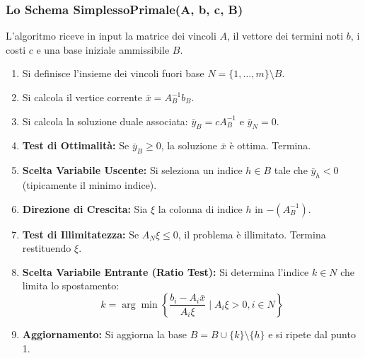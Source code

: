 \documentclass[12pt]{extarticle} %
\begin{document}
\subsubsection{Lo Schema SimplessoPrimale(A, b, c, B)}
L'algoritmo riceve in input la matrice dei vincoli $A$, il vettore dei termini noti $b$, i costi $c$ e una base iniziale ammissibile $B$.
\begin{enumerate}
    \item Si definisce l'insieme dei vincoli fuori base $N = \{1, \dots, m\} \setminus B$.
    \item Si calcola il vertice corrente $\bar{x} = A_B^{-1} b_B$.
    \item Si calcola la soluzione duale associata: $\bar{y}_B = c A_B^{-1}$ e $\bar{y}_N = 0$.
    \item \textbf{Test di Ottimalità:} Se $\bar{y}_B \ge 0$, la soluzione $\bar{x}$ è ottima. Termina.
    \item \textbf{Scelta Variabile Uscente:} Si seleziona un indice $h \in B$ tale che $\bar{y}_h < 0$ (tipicamente il minimo indice).
    \item \textbf{Direzione di Crescita:} Sia $\xi$ la colonna di indice $h$ in $-(A_B^{-1})$.
    \item \textbf{Test di Illimitatezza:} Se $A_N \xi \le 0$, il problema è illimitato. Termina restituendo $\xi$.
    \item \textbf{Scelta Variabile Entrante (Ratio Test):} Si determina l'indice $k \in N$ che limita lo spostamento:
    \[ k = \arg \min \left\{ \frac{b_i - A_i \bar{x}}{A_i \xi} \mid A_i \xi > 0, i \in N \right\} \]
    \item \textbf{Aggiornamento:} Si aggiorna la base $B = B \cup \{k\} \setminus \{h\}$ e si ripete dal punto 1.
\end{enumerate}
\end{document}
